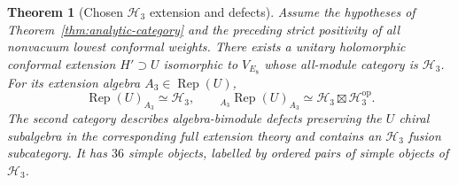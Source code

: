 \documentclass[11pt,a4paper]{article}
\newtheorem{theorem}{Theorem}[section]
\theoremstyle{definition}
\DeclareMathOperator{\Rep}{Rep}
\newcommand{\HH}{\mathcal H}
\begin{document}
\begin{theorem}[Chosen $\HH_3$ extension and defects]
\label{thm:analytic-e8-extension}
Assume the hypotheses of Theorem~\ref{thm:analytic-category} and the
preceding strict positivity of all nonvacuum lowest conformal weights.
There exists a unitary holomorphic conformal extension $H'\supset U$
isomorphic to $V_{E_8}$ whose all-module category is $\HH_3$.
For its extension algebra $A_3\in\Rep(U)$,
\begin{equation}
 \Rep(U)_{A_3}\simeq\HH_3,
 \qquad
 {}_{A_3}\Rep(U)_{A_3}\simeq\HH_3\boxtimes\HH_3^{\mathrm{op}}.
 \label{eq:analytic-extension-defects}
\end{equation}
The second category describes algebra-bimodule defects preserving the
$U$ chiral subalgebra in the corresponding full extension theory and
contains an $\HH_3$ fusion subcategory.  It has $36$ simple objects,
labelled by ordered pairs of simple objects of $\HH_3$.
\end{theorem}
\end{document}
